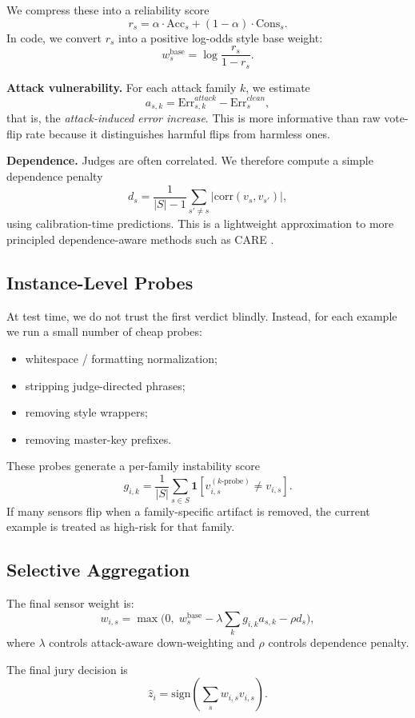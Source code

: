 \documentclass[11pt]{article}
\begin{document}
We compress these into a reliability score
\[
r_s = \alpha \cdot \text{Acc}_s + (1-\alpha)\cdot \text{Cons}_s.
\]
In code, we convert $r_s$ into a positive log-odds style base weight:
\[
w^{\text{base}}_s = \log \frac{r_s}{1-r_s}.
\]

\textbf{Attack vulnerability.} For each attack family $k$, we estimate
\[
a_{s,k} = \text{Err}^{attack}_{s,k} - \text{Err}^{clean}_{s},
\]
that is, the \emph{attack-induced error increase}. This is more informative than raw vote-flip rate because it distinguishes harmful flips from harmless ones.

\textbf{Dependence.} Judges are often correlated. We therefore compute a simple dependence penalty
\[
d_s = \frac{1}{|S|-1}\sum_{s' \neq s} \left|\text{corr}(v_s, v_{s'})\right|,
\]
using calibration-time predictions. This is a lightweight approximation to more principled dependence-aware methods such as CARE \citep{zhao2026care}.

\subsection{Instance-Level Probes}
At test time, we do not trust the first verdict blindly. Instead, for each example we run a small number of cheap probes:
\begin{itemize}
    \item whitespace / formatting normalization;
    \item stripping judge-directed phrases;
    \item removing style wrappers;
    \item removing master-key prefixes.
\end{itemize}

These probes generate a per-family instability score
\[
g_{i,k} = \frac{1}{|S|}\sum_{s \in S}\mathbf{1}\!\left[v_{i,s}^{(k\text{-probe})} \neq v_{i,s}\right].
\]
If many sensors flip when a family-specific artifact is removed, the current example is treated as high-risk for that family.

\subsection{Selective Aggregation}
The final sensor weight is:
\[
w_{i,s} = \max\Big(0,\; w^{\text{base}}_s - \lambda \sum_k g_{i,k}a_{s,k} - \rho d_s\Big),
\]
where $\lambda$ controls attack-aware down-weighting and $\rho$ controls dependence penalty.

The final jury decision is
\[
\hat{z}_i = \text{sign}\left(\sum_s w_{i,s}v_{i,s}\right).
\]
\end{document}
